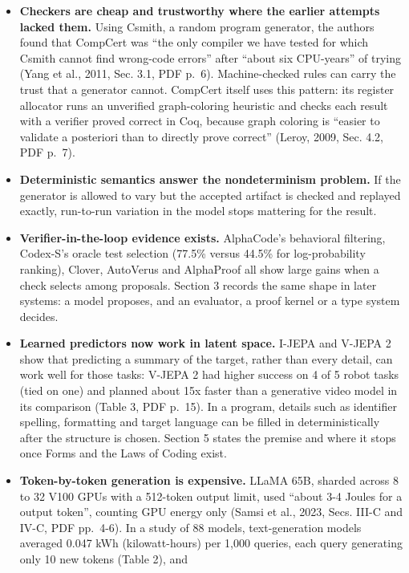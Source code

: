 \documentclass[10pt,letterpaper]{article}
\providecommand{\tightlist}{\setlength{\itemsep}{1pt}\setlength{\parskip}{0pt}}
\begin{document}
\begin{itemize}
\tightlist
\item
  \textbf{Checkers are cheap and trustworthy where the earlier attempts
  lacked them.} Using Csmith, a random program generator, the authors
  found that CompCert was ``the only compiler we have tested for which
  Csmith cannot find wrong-code errors'' after ``about six CPU-years''
  of trying (Yang et al., 2011, Sec. 3.1, PDF p.~6). Machine-checked
  rules can carry the trust that a generator cannot. CompCert itself
  uses this pattern: its register allocator runs an unverified
  graph-coloring heuristic and checks each result with a verifier proved
  correct in Coq, because graph coloring is ``easier to validate a
  posteriori than to directly prove correct'' (Leroy, 2009, Sec. 4.2,
  PDF p.~7).
\item
  \textbf{Deterministic semantics answer the nondeterminism problem.} If
  the generator is allowed to vary but the accepted artifact is checked
  and replayed exactly, run-to-run variation in the model stops
  mattering for the result.
\item
  \textbf{Verifier-in-the-loop evidence exists.} AlphaCode's behavioral
  filtering, Codex-S's oracle test selection (77.5\% versus 44.5\% for
  log-probability ranking), Clover, AutoVerus and AlphaProof all show
  large gains when a check selects among proposals. Section 3 records
  the same shape in later systems: a model proposes, and an evaluator, a
  proof kernel or a type system decides.
\item
  \textbf{Learned predictors now work in latent space.} I-JEPA and
  V-JEPA 2 show that predicting a summary of the target, rather than
  every detail, can work well for those tasks: V-JEPA 2 had higher
  success on 4 of 5 robot tasks (tied on one) and planned about 15x
  faster than a generative video model in its comparison (Table 3, PDF
  p.~15). In a program, details such as identifier spelling, formatting
  and target language can be filled in deterministically after the
  structure is chosen. Section 5 states the premise and where it stops
  once Forms and the Laws of Coding exist.
\item
  \textbf{Token-by-token generation is expensive.} LLaMA 65B, sharded
  across 8 to 32 V100 GPUs with a 512-token output limit, used ``about
  3-4 Joules for a output token'', counting GPU energy only (Samsi et
  al., 2023, Secs. III-C and IV-C, PDF pp.~4-6). In a study of 88
  models, text-generation models averaged 0.047 kWh (kilowatt-hours) per
  1,000 queries, each query generating only 10 new tokens (Table 2), and

\end{itemize}
\end{document}
